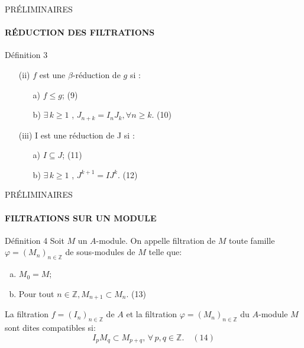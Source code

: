 \documentclass[11pt,a4paper]{beamer}
\begin{document}
		\begin{frame}{PRÉLIMINAIRES}
		\framesubtitle{RÉDUCTION DES FILTRATIONS}
		\begin{block}{Définition 3}
			\begin{enumerate}
				\item[(ii)] $f$ est une $\beta$-réduction de $g$ si : \\
				\begin{enumerate}
					\item[a)] $f \leq g$; (9)
					\item[b)]  $\exists \, k \geq 1$ , $J_{n+k} = I_n J_k , \forall n \geq k$. (10)
				\end{enumerate}
				\item[(iii)] I est une réduction de J si : \\
				\begin{enumerate}
					\item[a)] $I \subseteq J$; (11)
					\item[b)]  $\exists \, k \geq 1$ , $J^{k+1} = I J^k.$ (12)
				\end{enumerate}
			\end{enumerate}
		\end{block}
	\end{frame}
	
		\begin{frame}{PRÉLIMINAIRES}
		\framesubtitle{FILTRATIONS SUR UN MODULE}
		\begin{block}{Définition 4}
		Soit $M$ un $A$-module. On appelle filtration de $M$ toute famille $\varphi = (M_n)_{n \in \mathbb{Z}}$ de sous-modules de $M$ telle que:
			\begin{enumerate}[(a)]
				\item $M_0 = M$;
				\item Pour tout $n \in \mathbb{Z}, M_{n+1} \subset M_n$. (13)
			\end{enumerate}
			La filtration $f = (I_n)_{n \in \mathbb{Z}}$ de $A$ et la filtration $\varphi = (M_n)_{n \in \mathbb{Z}}$ du $A$-module $M$ sont dites compatibles si:
			\[ I_p M_q \subset M_{p+q} ,\, \forall \, p, q \in \mathbb{Z}. \quad (14)\]
		\end{block}
	\end{frame}
	
\end{document}

